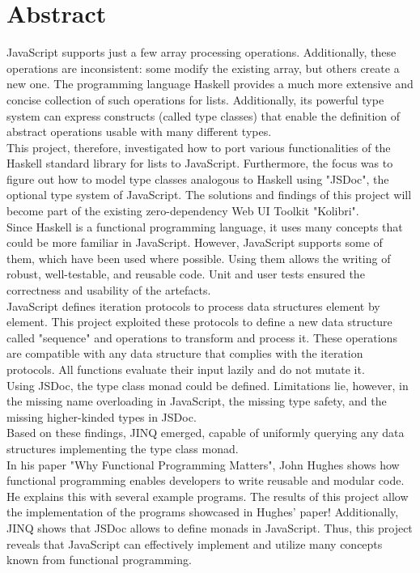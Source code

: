 \chapter*{Abstract}
\thispagestyle{empty}
JavaScript supports just a few array processing operations.
Additionally, these operations are inconsistent: some modify the existing
array, but others create a new one. The programming language Haskell provides a
much more extensive and concise collection of such operations for
lists. Additionally, its powerful type system can express
constructs (called type classes) that enable the definition of abstract
operations usable with many different types.\\ 
This project, therefore, investigated how to port various functionalities of
the Haskell standard library for lists to JavaScript. Furthermore, the focus
was to figure out how to model type classes analogous to Haskell using "JSDoc",
the optional type system of JavaScript. The solutions and
findings of this project will become part of the existing zero-dependency Web
UI Toolkit "Kolibri". \\
Since Haskell is a functional programming language, it uses many concepts that
could be more familiar in JavaScript. However, JavaScript supports some of them,
which have been used where possible. Using them allows the writing
of robust, well-testable, and reusable code. Unit and user tests ensured the
correctness and usability of the artefacts. \\
JavaScript defines iteration protocols to process data structures element by
element. This project exploited these protocols to define a new data structure
called "sequence" and operations to transform and process it. These operations
are compatible with any data structure that complies with the iteration
protocols. All functions evaluate their input lazily and do not mutate it.\\
Using JSDoc, the type class monad could be defined. Limitations lie, however,
in the missing name overloading in JavaScript, the missing type safety, and the
missing higher-kinded types in JSDoc.\\
Based on these findings, JINQ emerged, capable of uniformly querying any data
structures implementing the type class monad.\\
In his paper "Why Functional Programming Matters", John Hughes shows how
functional programming enables developers to write reusable and modular
code. He explains this with several example programs.
The results of this project allow the implementation of the programs showcased
in Hughes' paper! Additionally, JINQ shows that JSDoc allows to define
monads in JavaScript. Thus, this project reveals that JavaScript can
effectively implement and utilize many concepts known from functional
programming.
